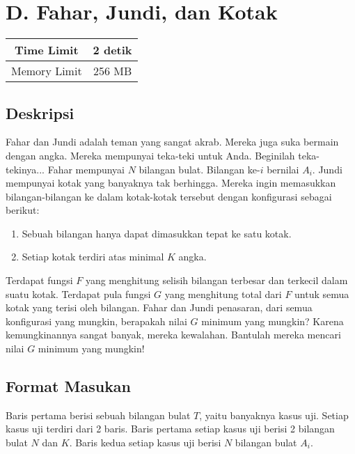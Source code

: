 \documentclass{article}
\begin{document}
\section*{\hfil D. Fahar, Jundi, dan Kotak\hfil}

\begin{center}
\begin{tabular}{ |cc| } 
 \hline
 Time Limit & 2 detik \\ 
 \hline
 Memory Limit & 256 MB \\
 \hline
\end{tabular}
\end{center}

\subsection*{Deskripsi}

\par Fahar dan Jundi adalah teman yang sangat akrab. Mereka juga suka bermain dengan angka. Mereka mempunyai teka-teki untuk Anda. Beginilah teka-tekinya... 
\newline
\newline Fahar mempunyai $N$ bilangan bulat. Bilangan ke-$i$ bernilai $A_{i}$. Jundi mempunyai kotak yang banyaknya tak berhingga. Mereka ingin memasukkan bilangan-bilangan ke dalam kotak-kotak tersebut dengan konfigurasi sebagai berikut:

\begin{enumerate}
  \item Sebuah bilangan hanya dapat dimasukkan tepat ke satu kotak.
  \item Setiap kotak terdiri atas minimal $K$ angka.
\end{enumerate}

\par\noindent Terdapat fungsi $F$ yang menghitung selisih bilangan terbesar dan terkecil dalam suatu kotak. Terdapat pula fungsi $G$ yang menghitung total dari $F$ untuk semua kotak yang terisi oleh bilangan. Fahar dan Jundi penasaran, dari semua konfigurasi yang mungkin, berapakah nilai $G$ minimum yang mungkin? Karena kemungkinannya sangat banyak, mereka kewalahan. Bantulah mereka mencari nilai $G$ minimum yang mungkin!

\subsection*{Format Masukan}
\par Baris pertama berisi sebuah bilangan bulat $T$, yaitu banyaknya kasus uji.
\newline Setiap kasus uji terdiri dari 2 baris.
\newline Baris pertama setiap kasus uji berisi 2 bilangan bulat $N$ dan $K$.
\newline Baris kedua setiap kasus uji berisi $N$ bilangan bulat $A_{i}$.
\end{document}
